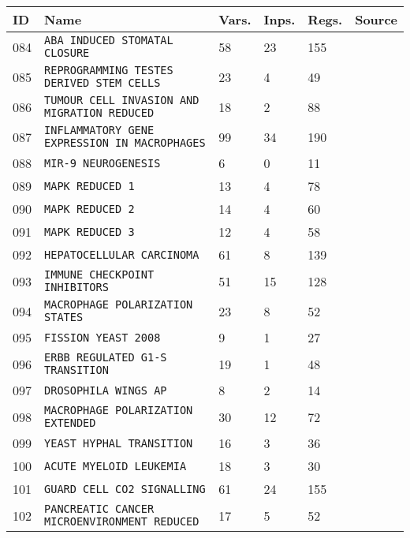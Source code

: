 \documentclass{article}
\begin{document}
\begin{center}
	\begin{tabular}{ | C{16pt} | C{149pt} | C{25pt} | C{25pt} | C{25pt} | C{36pt} | }
		\hline
		ID & Name & Vars. & Inps. & Regs. & Source \\ 
		 & \texttt{ABA INDUCED STOMATAL CLOSURE} & 58 & 23 & 155 & \cite{bbm-084} \\
		 & \texttt{REPROGRAMMING TESTES DERIVED STEM CELLS} & 23 & 4 & 49 & \cite{bbm-085} \\
		 & \texttt{TUMOUR CELL INVASION AND MIGRATION REDUCED} & 18 & 2 & 88 & \cite{bbm-065-086} \\
		 & \texttt{INFLAMMATORY GENE EXPRESSION IN MACROPHAGES} & 99 & 34 & 190 & \cite{bbm-087} \\
		 & \texttt{MIR-9 NEUROGENESIS} & 6 & 0 & 11 & \cite{bbm-088} \\
		 & \texttt{MAPK REDUCED 1} & 13 & 4 & 78 & \cite{bbm-070-089-090-091} \\
		 & \texttt{MAPK REDUCED 2} & 14 & 4 & 60 & \cite{bbm-070-089-090-091} \\
		 & \texttt{MAPK REDUCED 3} & 12 & 4 & 58 & \cite{bbm-070-089-090-091} \\
		 & \texttt{HEPATOCELLULAR CARCINOMA} & 61 & 8 & 139 & \cite{bbm-092-174} \\
		 & \texttt{IMMUNE CHECKPOINT INHIBITORS} & 51 & 15 & 128 & \cite{bbm-093} \\
		 & \texttt{MACROPHAGE POLARIZATION STATES} & 23 & 8 & 52 & \cite{bbm-094} \\
		 & \texttt{FISSION YEAST 2008} & 9 & 1 & 27 & \cite{bbm-095} \\
		 & \texttt{ERBB REGULATED G1-S TRANSITION} & 19 & 1 & 48 & \cite{bbm-096} \\
		 & \texttt{DROSOPHILA WINGS AP} & 8 & 2 & 14 & \cite{bbm-097} \\
		 & \texttt{MACROPHAGE POLARIZATION EXTENDED} & 30 & 12 & 72 & \cite{bbm-098} \\
		 & \texttt{YEAST HYPHAL TRANSITION} & 16 & 3 & 36 & \cite{bbm-099} \\
		 & \texttt{ACUTE MYELOID LEUKEMIA} & 18 & 3 & 30 & \cite{bbm-100} \\
		 & \texttt{GUARD CELL CO2 SIGNALLING} & 61 & 24 & 155 & \cite{bbm-101} \\
		 & \texttt{PANCREATIC CANCER MICROENVIRONMENT REDUCED} & 17 & 5 & 52 & \cite{bbm-102-103} \\

\end{tabular}
\end{center}
\end{document}

